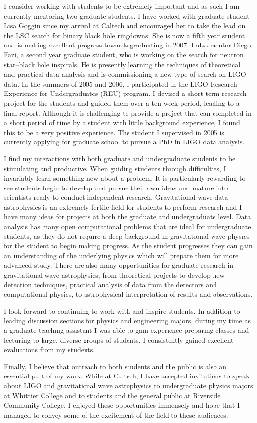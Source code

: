 I consider working with students to be extremely important and as such I am
currently mentoring two graduate students. I have worked with graduate student
Lisa Goggin since my arrival at Caltech and encouraged her to take the lead on
the LSC search for binary black hole ringdowns. She is now a fifth year
student and is making excellent progress towards graduating in 2007. I also
mentor Diego Fazi, a second year graduate student, who is working on the
search for neutron star--black hole inspirals. He is presently learning the
techniques of theoretical and practical data analysis and is commissioning a
new type of search on LIGO data. In the summers of 2005 and 2006, I
participated in the LIGO Research Experience for Undergraduates (REU) program.
I devised a short-term research project for the students and guided them
over a ten week period, leading to a final report. Although it is
challenging to provide a project that can completed in a short period of time
by a student with little background experience, I found this to be a very
positive experience. The student I supervised in 2005 is currently applying
for graduate school to pursue a PhD in LIGO data analysis.

I find my interactions with both graduate and undergraduate students to be
stimulating and productive. When guiding students through difficulties, I
invariably learn something new about a problem. It is particularly rewarding
to see students begin to develop and pursue their own ideas and mature into
scientists ready to conduct independent research. Gravitational wave data
astrophysics is an extremely fertile field for students to perform research
and I have many ideas for projects at both the graduate and undergraduate
level. Data analysis has many open computational problems that are ideal for
undergraduate students, as they do not require a deep background in
gravitational wave physics for the student to begin making progress. As the
student progresses they can gain an understanding of the underlying physics
which will prepare them for more advanced study.  There are also many
opportunities for graduate research in gravitational wave astrophysics, from
theoretical projects to develop new detection techniques, practical analysis
of data from the detectors and computational physics, to astrophysical
interpretation of results and observations.

I look forward to continuing to work with and inspire students. In addition to
leading discussion sections for physics and engineering majors, during my time
as a graduate teaching assistant I was able to gain experience preparing
classes and lecturing to large, diverse groups of students. I consistently
gained excellent evaluations from my students. 

Finally, I believe that outreach to both students and the public is also an
essential part of my work. While at Caltech, I have accepted invitations to
speak about LIGO and gravitational wave astrophysics to undergraduate physics
majors at Whittier College and to students and the general public at Riverside
Community College.  I enjoyed these opportunities immensely and hope that I
managed to convey some of the excitement of the field to these audiences.
